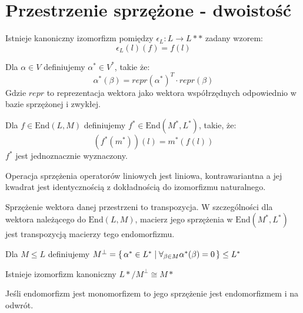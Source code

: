 \section{Przestrzenie sprzężone - dwoistość}


\begin{statement}
    Istnieje kanoniczny izomorfizm pomiędzy $\epsilon_L : L \to L**$ zadany wzorem:
    \begin{equation*}
        \epsilon_L(l)(f) = f(l)
    \end{equation*}
\end{statement}

\begin{definition}
    Dla $\alpha \in V$ definiujemy $\alpha^* \in V^*$, takie że:
    \begin{equation*}
        \alpha^* (\beta) = repr(\alpha^*)^{T} \cdot  repr(\beta)
    \end{equation*}
    Gdzie $repr$ to reprezentacja wektora jako wektora współrzędnych odpowiednio w bazie sprzężonej i zwykłej.
\end{definition}

\begin{definition}
    Dla $f \in \text{End}(L, M)$ definiujemy $f^* \in \text{End}(M^*, L^*)$, takie, że:
    \begin{equation*}
        (f^*(m^*))(l) = m^*(f(l))
    \end{equation*}
    $f^*$ jest jednoznacznie wyznaczony.
\end{definition}

\begin{statement}
    Operacja sprzężenia operatorów liniowych jest liniowa, kontrawariantna a jej kwadrat jest 
    identycznością z dokładnością do izomorfizmu naturalnego.
\end{statement}

\begin{statement}
    Sprzężenie wektora danej przestrzeni to transpozycja. W szczególności dla wektora należącego do $\text{End}(L, M)$, macierz jego sprzężenia w $\text{End}(M^*, L^*)$ jest transpozycją macierzy tego endomorfizmu.
\end{statement}

\begin{definition}
    Dla $M \leq L$ definiujemy $M^{\perp} = \set{ \alpha^* \in L^* \mid \forall_{\beta \in M} \alpha^*(\beta) = 0 } \leq L^*$
\end{definition}

\begin{statement}
    Istnieje izomorfizm kanoniczny $L* / M^{\perp} \cong M*$
\end{statement}
\begin{statement}
    Jeśli endomorfizm jest monomorfizem to jego sprzężenie jest endomorfizmem i na odwrót.
\end{statement}